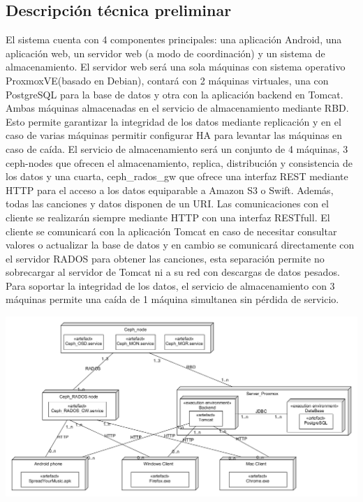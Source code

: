 \subsection{Descripci\'on t\'ecnica preliminar}
El sistema cuenta con 4 componentes principales: una aplicaci\'on Android, una aplicaci\'on web, un servidor web (a modo de coordinaci\'on) y un sistema de almacenamiento.
El servidor web ser\'a una sola m\'aquinas con sistema operativo ProxmoxVE(basado en Debian), contar\'a con 2 m\'aquinas virtuales, una con PostgreSQL para la base de datos y otra con la aplicaci\'on backend en Tomcat. Ambas m\'aquinas almacenadas en el servicio de almacenamiento mediante RBD. Esto permite garantizar la integridad de los datos mediante replicaci\'on y en el caso de varias m\'aquinas permitir configurar HA para levantar las m\'aquinas en caso de ca\'ida.
El servicio de almacenamiento ser\'a un conjunto de 4 m\'aquinas, 3 ceph-nodes que ofrecen el almacenamiento, replica, distribuci\'on y consistencia de los datos y una cuarta, ceph\_rados\_gw que ofrece una interfaz REST mediante HTTP para el acceso a los datos equiparable a Amazon S3 o Swift. Adem\'as, todas las canciones y datos disponen de un URI.
Las comunicaciones con el cliente se realizar\'an siempre mediante HTTP con una interfaz RESTfull. El cliente se comunicar\'a con la aplicaci\'on Tomcat en caso de necesitar consultar valores o actualizar la base de datos y en cambio se comunicar\'a directamente con el servidor RADOS para obtener las canciones, esta separaci\'on permite no sobrecargar al servidor de Tomcat ni a su red con descargas de datos pesados.
Para soportar la integridad de los datos, el servicio de almacenamiento con 3 m\'aquinas permite una ca\'ida de 1 m\'aquina simultanea sin p\'erdida de servicio.

\includegraphics[width=\textwidth]{Figures/deployment.png}